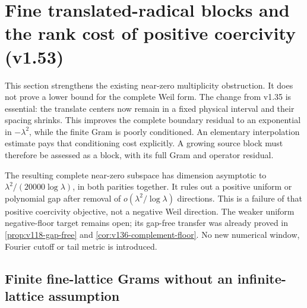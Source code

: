\documentclass[11pt]{article}
\theoremstyle{remark}
\begin{document}
\section{Fine translated-radical blocks and the rank cost of positive coercivity (v1.53)}
\label{sec:v153-fine-block}
This section strengthens the existing near-zero multiplicity obstruction.
It does not prove a lower bound for the complete Weil form. The change
from v1.35 is essential: the translate centers now remain in a fixed
physical interval and their spacing shrinks. This improves the complete
boundary residual to an exponential in $-\lambda^2$, while the finite
Gram is poorly conditioned. An elementary interpolation estimate pays
that conditioning cost explicitly. A growing source block must therefore
be assessed as a block, with its full Gram and operator residual.

The resulting complete near-zero subspace has dimension asymptotic to
$\lambda^2/(20000\log\lambda)$, in both parities together. It rules out
a positive uniform or polynomial gap after removal of
$o(\lambda^2/\log\lambda)$ directions. This is a failure of that positive
coercivity objective, not a negative Weil direction. The weaker uniform
negative-floor target remains open; its gap-free transfer was already
proved in \ref{prop:v118-gap-free} and \ref{cor:v136-complement-floor}.
No new numerical window, Fourier cutoff or tail metric is introduced.

\subsection*{Finite fine-lattice Grams without an infinite-lattice assumption}
\end{document}
